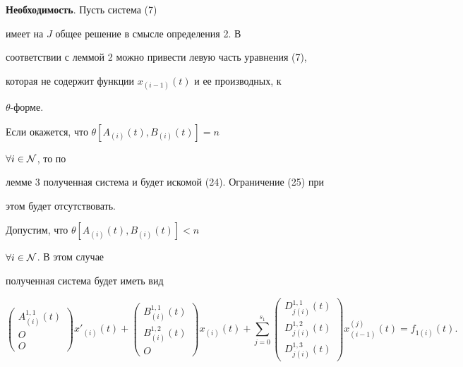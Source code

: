 \begin{pf}


{\bf Необходимость}. Пусть система (7)


имеет на $J$ общее решение в смысле определения 2. В


соответствии с леммой 2 можно привести левую часть уравнения (7),


которая не содержит функции $x_{(i-1)}(t)$ и ее производных, к


$\theta$-форме.





Если окажется, что $\theta[A_{(i)}(t),B_{(i)}(t)]=n$ \;


$\forall i \in \cal N$, то по


лемме 3 полученная система и будет искомой (24). Ограничение (25) при


этом будет отсутствовать.





Допустим, что $\theta[A_{(i)}(t),B_{(i)}(t)]<n$ \;


$\forall i \in \cal N$. В этом случае


полученная система будет иметь вид


\begin{equation}


\begin{pmatrix}


A_{(i)}^{1,1}(t) \\[2mm] O \\[2mm] O 


\end{pmatrix} x'_{(i)}(t)+


\begin{pmatrix}


B_{(i)}^{1,1}(t) \\[2mm] B_{(i)}^{1,2}(t) \\[2mm] O 


\end{pmatrix} x_{(i)}(t)+\sum_{j=0}^{s_1}


\begin{pmatrix}


D_{j(i)}^{1,1}(t) \\[2mm] D_{j(i)}^{1,2}(t) \\[2mm] D_{j(i)}^{1,3}(t) 


\end{pmatrix} x_{(i-1)}^{(j)}(t) =f_{1(i)}(t).


\end{equation}






\end{pf}
